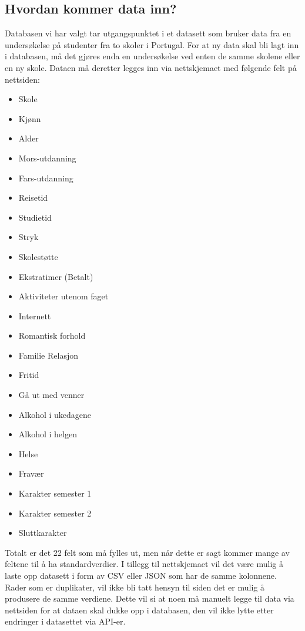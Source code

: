 \subsection{Hvordan kommer data inn?}
Databasen vi har valgt tar utgangspunktet i et datasett som bruker data fra en undersøkelse på studenter fra to skoler i Portugal. For at ny data skal bli lagt inn i databasen, må det gjøres enda en undersøkelse ved enten de samme skolene eller en ny skole. Dataen må deretter legges inn via nettskjemaet med følgende felt på nettsiden:

\begin{itemize}
  \item Skole
  \item Kjønn
  \item Alder
  \item Mors-utdanning
  \item Fars-utdanning
  \item Reisetid
  \item Studietid
  \item Stryk
  \item Skolestøtte
  \item Ekstratimer (Betalt)
  \item Aktiviteter utenom faget
  \item Internett
  \item Romantisk forhold
  \item Familie Relasjon
  \item Fritid
  \item Gå ut med venner
  \item Alkohol i ukedagene
  \item Alkohol i helgen
  \item Helse
  \item Fravær
  \item Karakter semester 1
  \item Karakter semester 2
  \item Sluttkarakter
\end{itemize}

Totalt er det 22 felt som må fylles ut, men når dette er sagt kommer mange av feltene til å ha standardverdier. I tillegg til nettskjemaet vil det være mulig å laste opp datasett i form av CSV eller JSON som har de samme kolonnene. Rader som er duplikater, vil ikke bli tatt hensyn til siden det er mulig å produsere de samme verdiene. Dette vil si at noen må manuelt legge til data via nettsiden for at dataen skal dukke opp i databasen, den vil ikke lytte etter endringer i datasettet via API-er.

